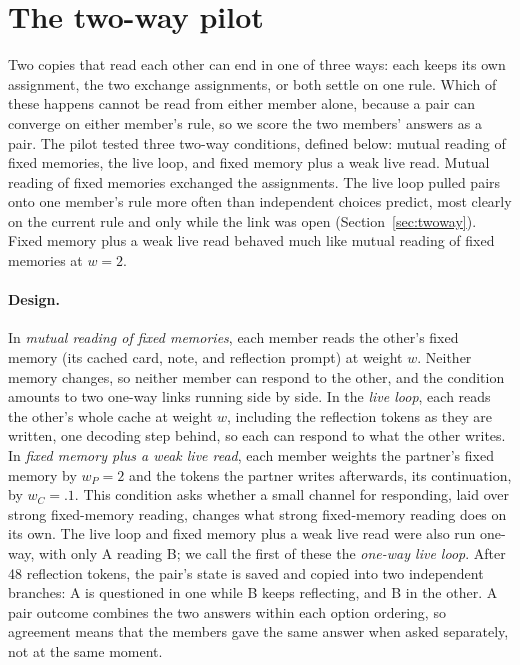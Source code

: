 \section{The two-way pilot}
\label{app:pairs}

Two copies that read each other can end in one of three ways: each
keeps its own assignment, the two exchange assignments, or both settle
on one rule. Which of these happens cannot be read from either member
alone, because a pair can converge on either member's rule, so we score
the two members' answers as a pair. The pilot tested three two-way
conditions, defined below: mutual reading of fixed memories, the live
loop, and fixed memory plus a weak live read. Mutual reading of fixed
memories exchanged the assignments. The live loop pulled pairs
onto one member's rule more often than independent choices predict,
most clearly on the current rule and only while the link was open
(Section~\ref{sec:twoway}). Fixed memory plus a weak live read behaved
much like mutual reading of fixed memories at $w=2$.

\paragraph{Design.}
In \emph{mutual reading of fixed memories}, each member reads the
other's fixed memory (its cached card, note, and reflection prompt) at
weight $w$. Neither memory changes, so neither member can respond to
the other, and the condition amounts to two one-way links running side
by side. In the \emph{live loop}, each reads the other's whole cache at
weight $w$, including the reflection tokens as they are written, one
decoding step behind, so each can respond to what the other writes. In
\emph{fixed memory plus a weak live read}, each member weights the
partner's fixed memory by $w_P=2$ and the tokens the partner writes
afterwards, its continuation, by $w_C=.1$. This condition asks whether a
small channel for responding, laid over strong fixed-memory reading,
changes what strong fixed-memory reading does on its own. The live loop
and fixed memory plus a weak live read were also run one-way, with only
A reading B; we call the first of these the \emph{one-way live loop}.
After 48 reflection tokens, the pair's state is saved and copied into two
independent branches: A is questioned in one while B keeps reflecting,
and B in the other. A pair outcome combines the two answers within each
option ordering, so agreement means that the members gave the same
answer when asked separately, not at the same moment.

